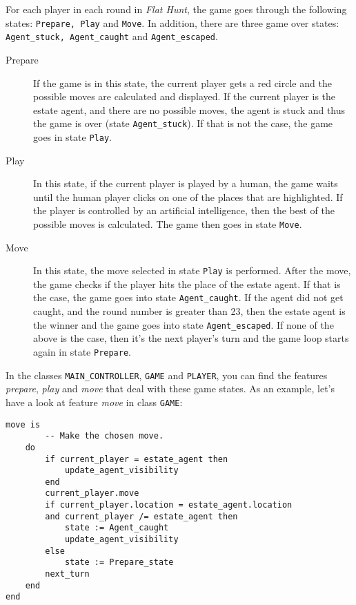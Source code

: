 For each player in each round in \emph{Flat Hunt}, the game goes through the following states: \texttt{Prepare, Play} and \texttt{Move}. In addition, there are three game over states: \texttt{Agent\_stuck, Agent\_caught} and \texttt{Agent\_escaped}.

\begin{description}
    
  \item[Prepare] If the game is in this state, the current player gets a red circle and the possible moves are calculated and displayed. If the current player is the estate agent, and there are no possible moves, the agent is stuck and thus the game is over (state \texttt{Agent\_stuck}). If that is not the case, the game goes in state \texttt{Play}.
  
  \item[Play] In this state, if the current player is played by a human, the game waits until the human player clicks on one of the places that are highlighted. If the player is controlled by an artificial intelligence, then the best of the possible moves is calculated. The game then goes in state \texttt{Move}.
  
  \item[Move] In this state, the move selected in state \texttt{Play} is performed. After the move, the game checks if the player hits the place of the estate agent. If that is the case, the game goes into state \texttt{Agent\_caught}. If the agent did not get caught, and the round number is greater than 23, then the estate agent is the winner and the game goes into state \texttt{Agent\_escaped}. If none of the above is the case, then it's the next player's turn and the game loop starts again in state \texttt{Prepare}.

\end{description}

In the classes \texttt{MAIN\_CONTROLLER}, \texttt{GAME} and \texttt{PLAYER}, you can find the features \textit{prepare}, \textit{play} and \textit{move} that deal with these game states. As an example, let's have a look at feature \textit{move} in class \texttt{GAME}:\\

\begin{lstlisting}
move is
		-- Make the chosen move.
	do
		if current_player = estate_agent then
			update_agent_visibility
		end
		current_player.move
		if current_player.location = estate_agent.location 
		and current_player /= estate_agent then
			state := Agent_caught
			update_agent_visibility
		else
			state := Prepare_state			
		next_turn
	end    
end             
\end{lstlisting}
